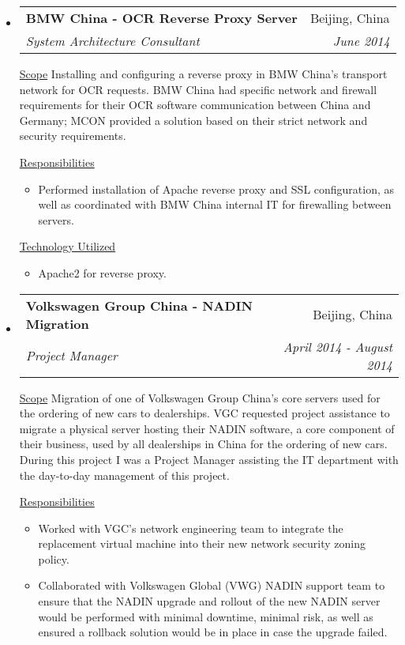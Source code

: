 \documentclass[a4paper,11pt]{article}
\makeatletter
\newcommand{\resitem}[1]{\item #1 \vspace{-2pt}}
\newcommand{\ressubheading}[4]{
\begin{tabular*}{6.5in}{l@{\cftdotfill{\cftsecdotsep}\extracolsep{\fill}}r}
        \textbf{#1} & #2 \\
        \textit{#3} & \textit{#4} \\
\end{tabular*}\vspace{-6pt}}
\makeatother
\begin{document}
\begin{itemize}

    \item
        \ressubheading{BMW China - OCR Reverse Proxy Server}{Beijing, China}{System Architecture Consultant}{June 2014}
        \linebreak
        \linebreak

        \underline{Scope}
        \linebreak
        \linebreak
        Installing and configuring a reverse proxy in BMW China's transport network for OCR requests. BMW China had specific network and firewall requirements for their OCR software communication between China and Germany; MCON provided a solution based on their strict network and security requirements.

        \underline{Responsibilities}
        \begin{itemize}
            \resitem{Performed installation of Apache reverse proxy and SSL configuration, as well as coordinated with BMW China internal IT for firewalling between servers.}
        \end{itemize}

        \underline{Technology Utilized}
        \begin{itemize}
            \resitem{Apache2 for reverse proxy.}
        \end{itemize}

    \item
        \ressubheading{Volkswagen Group China - NADIN Migration}{Beijing, China}{Project Manager}{April 2014 - August 2014}
        \linebreak
        \linebreak

        \underline{Scope}
        \linebreak
        \linebreak
        Migration of one of Volkswagen Group China's core servers used for the ordering of new cars to dealerships. VGC requested project assistance to migrate a physical server hosting their NADIN software, a core component of their business, used by all dealerships in China for the ordering of new cars. During this project I was a Project Manager assisting the IT department with the day-to-day management of this project.

        \underline{Responsibilities}
        \begin{itemize}
            \resitem{Worked with VGC's network engineering team to integrate the replacement virtual machine into their new network security zoning policy.}
            \resitem{Collaborated with Volkswagen Global (VWG) NADIN support team to ensure that the NADIN upgrade and rollout of the new NADIN server would be performed with minimal downtime, minimal risk, as well as ensured a rollback solution would be in place in case the upgrade failed.}
        \end{itemize}


\end{itemize}
\end{document}
